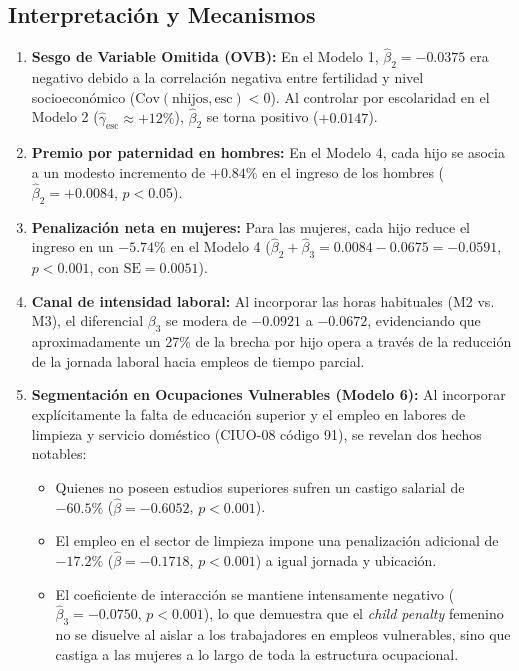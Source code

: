 \documentclass[11pt,a4paper]{article}
\begin{document}
\subsection{Interpretación y Mecanismos}
\begin{enumerate}
    \item \textbf{Sesgo de Variable Omitida (OVB):} En el Modelo 1, $\hat{\beta}_2 = -0.0375$ era negativo debido a la correlación negativa entre fertilidad y nivel socioeconómico ($\text{Cov}(\text{nhijos}, \text{esc}) < 0$). Al controlar por escolaridad en el Modelo 2 ($\hat{\gamma}_{\text{esc}} \approx +12\%$), $\hat{\beta}_2$ se torna positivo ($+0.0147$).
    \item \textbf{Premio por paternidad en hombres:} En el Modelo 4, cada hijo se asocia a un modesto incremento de $+0.84\%$ en el ingreso de los hombres ($\hat{\beta}_2 = +0.0084$, $p < 0.05$).
    \item \textbf{Penalización neta en mujeres:} Para las mujeres, cada hijo reduce el ingreso en un \textbf{$-5.74\%$} en el Modelo 4 ($\hat{\beta}_2 + \hat{\beta}_3 = 0.0084 - 0.0675 = -0.0591$, $p < 0.001$, con $\text{SE} = 0.0051$).
    \item \textbf{Canal de intensidad laboral:} Al incorporar las horas habituales (M2 vs. M3), el diferencial $\beta_3$ se modera de $-0.0921$ a $-0.0672$, evidenciando que aproximadamente un 27\% de la brecha por hijo opera a través de la reducción de la jornada laboral hacia empleos de tiempo parcial.
    \item \textbf{Segmentación en Ocupaciones Vulnerables (Modelo 6):} Al incorporar explícitamente la falta de educación superior y el empleo en labores de limpieza y servicio doméstico (CIUO-08 código 91), se revelan dos hechos notables:
    \begin{itemize}
        \item Quienes no poseen estudios superiores sufren un castigo salarial de $-60.5\%$ ($\hat{\beta} = -0.6052$, $p < 0.001$).
        \item El empleo en el sector de limpieza impone una penalización adicional de $-17.2\%$ ($\hat{\beta} = -0.1718$, $p < 0.001$) a igual jornada y ubicación.
        \item El coeficiente de interacción se mantiene intensamente negativo ($\hat{\beta}_3 = -0.0750$, $p < 0.001$), lo que demuestra que el \textit{child penalty} femenino no se disuelve al aislar a los trabajadores en empleos vulnerables, sino que castiga a las mujeres a lo largo de toda la estructura ocupacional.
    \end{itemize}
\end{enumerate}
\end{document}
